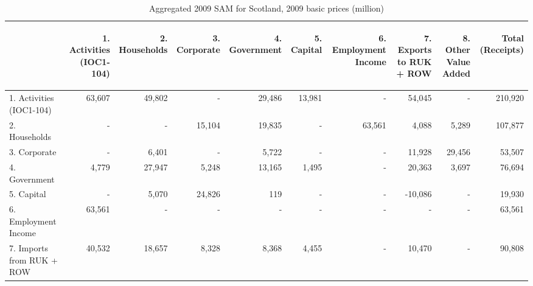 \begin{table}[H] \caption{Aggregated 2009 SAM for Scotland, 2009 basic prices (\textsterling million)}
\bigskip \begin{scriptsize} \begin{centering} \begin{doublespacing}
    \begin{tabular}{lrrrrrrrrr}
          \toprule
          & \begin{sideways}1. Activities (IOC1-104)\end{sideways} & \begin{sideways}2. Households\end{sideways} & \begin{sideways}3. Corporate\end{sideways} & \begin{sideways}4. Government\end{sideways} & \begin{sideways}5. Capital\end{sideways} & \begin{sideways}6. Employment Income\end{sideways} & \begin{sideways}7. Exports to RUK + ROW\end{sideways} & \begin{sideways}8. Other Value Added\end{sideways} & \begin{sideways}Total (Receipts)\end{sideways} \bigstrut\\
    \hline
    1. Activities (IOC1-104) & 63,607 & 49,802 & -     & 29,486 & 13,981 & -     & 54,045 & -     & 210,920 \bigstrut[t]\\
    2. Households & -     & -     & 15,104 & 19,835 & -     & 63,561 & 4,088 & 5,289 & 107,877 \\
    3. Corporate & -     & 6,401 & -     & 5,722 & -     & -     & 11,928 & 29,456 & 53,507 \\
    4. Government & 4,779 & 27,947 & 5,248 & 13,165 & 1,495 & -     & 20,363 & 3,697 & 76,694 \bigstrut[b]\\
    5. Capital & -     & 5,070 & 24,826 & 119   & -     & -     & -10,086 & -     & 19,930 \bigstrut[t]\\
    6. Employment Income & 63,561 & -     & -     & -     & -     & -     & -     & -     & 63,561 \\
    7. Imports from RUK + ROW & 40,532 & 18,657 & 8,328 & 8,368 & 4,455 & -     & 10,470 & -     & 90,808 \\

\end{tabular}
\end{doublespacing}
\end{centering}
\end{scriptsize}
\end{table}
